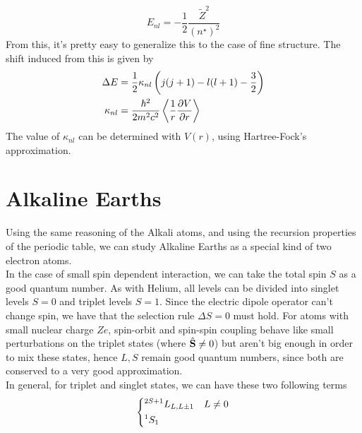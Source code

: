 \documentclass[../qm.tex]{subfiles}
\begin{document}
	\begin{equation}
		E_{nl}=-\frac{1}{2}\frac{\tilde{Z}^2}{(n^{\star})^2}
		\label{eq:spectrumemissionalkali}
	\end{equation}
	From this, it's pretty easy to generalize this to the case of fine structure. The shift induced from this is given by
	\begin{equation}
		\begin{aligned}
			\Delta E&=\frac{1}{2}\kappa_{nl}\left( j(j+1)-l(l+1)-\frac{3}{2} \right)\\
			\kappa_{nl}&=\frac{\hbar^2}{2m^2c^2}\expval{\frac{1}{r}\pdv{V}{r}}
		\end{aligned}
		\label{eq:finestructureshiftalkali}
	\end{equation}
	The value of $\kappa_{nl}$ can be determined with $V(r)$, using Hartree-Fock's approximation.
	\section{Alkaline Earths}
	Using the same reasoning of the Alkali atoms, and using the recursion properties of the periodic table, we can study Alkaline Earths as a special kind of two electron atoms.\\
	In the case of small spin dependent interaction, we can take the total spin $S$ as a good quantum number. As with Helium, all levels can be divided into singlet levels $S=0$ and triplet levels $S=1$. Since the electric dipole operator can't change spin, we have that the selection rule $\Delta S=0$ must hold. For atoms with small nuclear charge $Ze$, spin-orbit and spin-spin coupling behave like small perturbations on the triplet states (where $\hat{\mathbf{S}}\ne0$) but aren't big enough in order to mix these states, hence $L,S$ remain good quantum numbers, since both are conserved to a very good approximation.\\
	In general, for triplet and singlet states, we can have these two following terms
	\begin{equation}
		\begin{dcases}
			\term[L,L\pm1]{L}{2S+1}&L\ne0\\
			\term[1]{S}{1}
		\end{dcases}
		\label{eq:possibletermsalkaliearths}
	\end{equation}
\end{document}
